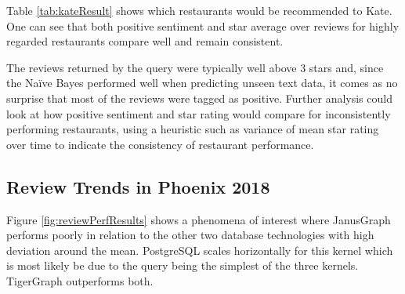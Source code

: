 
Table \ref{tab:kateResult} shows which restaurants would be recommended to Kate. One can see that both positive sentiment and star average over reviews for highly regarded restaurants compare well and remain consistent.

The reviews returned by the query were typically well above 3 stars and, since the Na\"ive Bayes performed well when predicting unseen text data, it comes as no surprise that most of the reviews were tagged as positive. Further analysis could look at how positive sentiment and star rating would compare for inconsistently performing restaurants, using a heuristic such as variance of mean star rating over time to indicate the consistency of restaurant performance. %

\subsection{Review Trends in Phoenix 2018}
\label{sec:resultReviews2018}

Figure \ref{fig:reviewPerfResults} shows a phenomena of interest where JanusGraph performs poorly in relation to the other two database technologies with high deviation around the mean. PostgreSQL scales horizontally for this kernel which is most likely be due to the query being the simplest of the three kernels. TigerGraph outperforms both.

